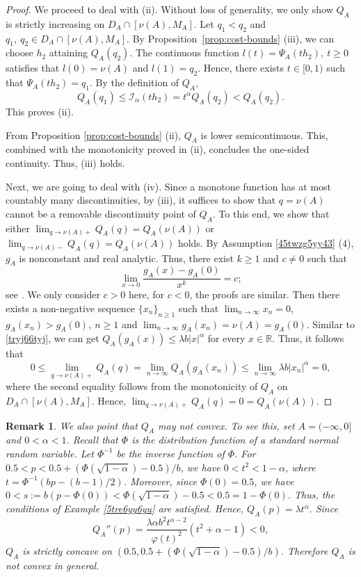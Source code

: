 \documentclass[a4paper, 11pt]{article}
\newcommand{\1}{\mathbf 1}
\theoremstyle{plain}
\newtheorem{remark}{Remark}[section]
\begin{document}
\begin{proof}
We proceed to deal with (ii). Without loss of generality, we only show
$Q_A$ is strictly increasing on \(D_A\cap[\nu(A),M_A]\). Let \(q_1<q_2\) and $q_1,~q_2\in D_A\cap[\nu(A),M_A]$.
By Proposition~\ref{prop:cost-bounds} (iii), we can choose \(h_2\) attaining \(Q_A(q_2)\).
The continuous function \(l(t)=\Psi_A(th_2),~t\geq0\) satisfies that $l(0)=\nu(A)$ and $l(1)=q_2$. Hence, there exists \(t\in[0,1)\) such that
\(\Psi_A(th_2)=q_1\). By the definition of $Q_A$,
\[
  Q_A(q_1)\leq\mathcal{I_{\alpha}}(th_2)=t^\alpha Q_A(q_2)<Q_A(q_2).
\]
This proves (ii).
\par
From Proposition \ref{prop:cost-bounds} (ii), $Q_A$ is lower semicontinuous. This, combined with the monotonicity proved in (ii), concludes the one-sided continuity. Thus, (iii) holds.
\par
Next, we are going to deal with (iv). Since a monotone function has at most countably many discontinuities, by (iii), it suffices to show that $q=\nu(A)$ cannot be a removable discontinuity point of $Q_A$. To this end, we show that either $\lim_{q\to\nu(A)+}Q_A(q)=Q_A(\nu(A))$ or $\lim_{q\to\nu(A)-}Q_A(q)=Q_A(\nu(A))$ holds. By Assumption \ref{45twzg5yy43} (4), \(g_A\) is nonconstant and real analytic. Thus, there exist \(k\geq1\) and \(c\neq0\) such that
$$\lim_{x\to0}\frac{g_A(x)-g_A(0)}{x^k}=c;$$
see \cite[Sections~1.1--1.2]{KrantzParks}. We only consider $c>0$ here, for $c<0$, the proofs are similar. Then there exists a non-negative sequence $\{x_n\}_{n\geq1}$ such that $\lim_{n\to\infty}x_n=0$, $g_A(x_n)>g_A(0),~n\geq1$ and $\lim_{n\to\infty}g_A(x_n)= \nu(A)=g_A(0)$. Similar to \eqref{tryj66tyj}, we can get \(Q_A(g_A(x))\leq\lambda b|x|^\alpha\) for every \(x\in\mathbb R\). Thus, it follows that
$$0\leq\lim_{q\to\nu(A)+}Q_A(q)=\lim_{n\to\infty}Q_A(g_A(x_n))\leq \lim_{n\to\infty}\lambda b|x_n|^\alpha=0,$$
where the second equality follows from the monotonicity of $Q_A$ on \(D_A\cap[\nu(A),M_A]\). Hence, $\lim_{q\to\nu(A)+}Q_A(q)=0=Q_A(\nu(A)).$
\end{proof}
\begin{remark}
  We also point that \(Q_A\) may not convex. To see this, set \(A=(-\infty,0]\) and \(0<\alpha<1\). Recall that $\Phi$ is the distribution function of a standard normal random
variable. Let $\Phi^{-1}$ be the inverse function of $\Phi$. For $0.5<p<0.5+{(\Phi(\sqrt{1-\alpha})-0.5)/}{b}$, we have \(0<t^2<1-\alpha\), where $t=\Phi^{-1}\left(bp-(b-1)/2\right)$. Moreover, since \(\Phi(0)=0.5\), we have
\(0<s:=b(p-\Phi(0))<\Phi(\sqrt{1-\alpha})-0.5<0.5=1-\Phi(0)\). Thus, the conditions of Example \ref{5tre6yy6yu} are satisfied. Hence,
$
Q_A(p)=\lambda t^\alpha.
$
Since
\[
Q_A''(p)
=
\frac{\lambda\alpha b^2t^{\alpha-2}}
     {\varphi(t)^2}
\left(t^2+\alpha-1\right)
<0,
\]
\(Q_A\) is strictly concave on $(0.5,0.5+{(\Phi(\sqrt{1-\alpha})-0.5)/}{b})$. Therefore $Q_A$ is not convex in general.
\end{remark}
\end{document}
